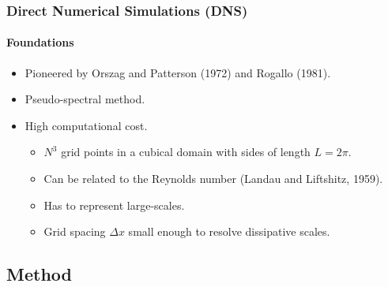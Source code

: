 \documentclass{beamer}
\begin{document}
\begin{frame}
 \frametitle{Direct Numerical Simulations (DNS)}
 \framesubtitle{Foundations}
 
 \begin{itemize}
  \item Pioneered by Orszag and Patterson (1972) and Rogallo (1981).
  \item<2-> Pseudo-spectral method.%
  \item<3-> High computational cost. \begin{itemize}
                                      \item<4-> $N^3$ grid points in a cubical domain with sides of length $L=2\pi$. 
                                      \item<5-> Can be related to the Reynolds number (Landau and Liftshitz, 1959).
                                      \item<6-> Has to represent large-scales.
                                      \item<7-> Grid spacing $\Delta x$ small enough to resolve dissipative scales.
                                     \end{itemize}

 \end{itemize}
\end{frame}

\subsection{Method}
\end{document}
